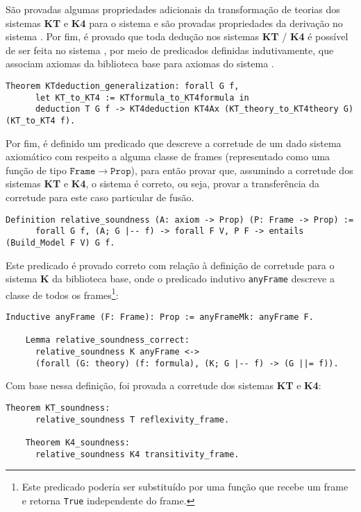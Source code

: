       São provadas algumas propriedades adicionais da transformação de teorias dos sistemas \textbf{KT} e \textbf{K4} para o sistema \SisT e são provadas
      propriedades da derivação no sistema \SisT. Por fim, é provado que toda dedução nos sistemas \textbf{KT} / \textbf{K4} é possível de ser feita no sistema \SisT,
      por meio de predicados definidas indutivamente, que associam axiomas da biblioteca base para axiomas do sistema \SisT.
      \begin{lstlisting}[language=coq]
    Theorem KTdeduction_generalization: forall G f,
      let KT_to_KT4 := KTformula_to_KT4formula in
      deduction T G f -> KT4deduction KT4Ax (KT_theory_to_KT4theory G) (KT_to_KT4 f).
      \end{lstlisting}

      Por fim, é definido um predicado que descreve a corretude de um dado sistema axiomático com respeito a alguma classe de frames (representado como uma função de tipo
      \(\mathtt{Frame} \to \mathtt{Prop}\)), para então provar que, assumindo a corretude dos sistemas \textbf{KT} e \textbf{K4}, o sistema \SisT é correto, ou seja, provar
      a transferência da corretude para este caso particular de fusão.

      \begin{lstlisting}[language=coq]
    Definition relative_soundness (A: axiom -> Prop) (P: Frame -> Prop) :=
      forall G f, (A; G |-- f) -> forall F V, P F -> entails (Build_Model F V) G f.
      \end{lstlisting}
      Este predicado é provado correto com relação à definição de corretude para o sistema \textbf{K} da biblioteca base, onde o predicado indutivo \texttt{anyFrame} descreve a classe de todos os
      frames\footnote{Este predicado poderia ser substituído por uma função que recebe um frame e retorna \texttt{True} independente do frame.}:

      \begin{lstlisting}[language=coq]
    Inductive anyFrame (F: Frame): Prop := anyFrameMk: anyFrame F.

    Lemma relative_soundness_correct:
      relative_soundness K anyFrame <->
      (forall (G: theory) (f: formula), (K; G |-- f) -> (G ||= f)).
      \end{lstlisting}

        Com base nessa definição, foi provada a corretude dos sistemas \textbf{KT} e \textbf{K4}:
      \begin{lstlisting}[language=coq]
    Theorem KT_soundness:
      relative_soundness T reflexivity_frame.

    Theorem K4_soundness:
      relative_soundness K4 transitivity_frame.
      \end{lstlisting}

